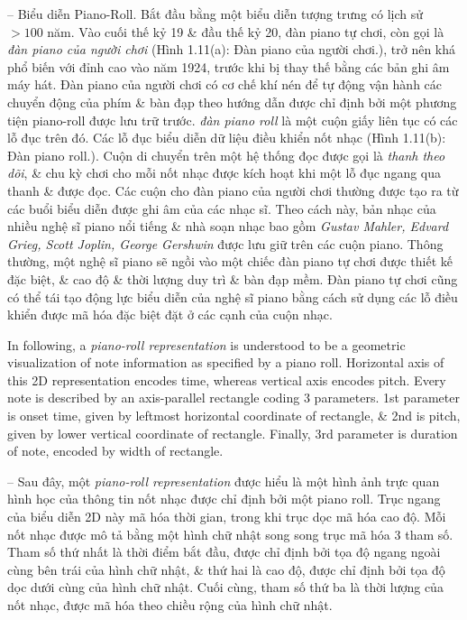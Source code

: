 \documentclass{article}
\begin{document}
\begin{itemize}
\begin{itemize}
\begin{itemize}
			-- {\sf Biểu diễn Piano-Roll.} Bắt đầu bằng một biểu diễn tượng trưng có lịch sử $> 100$ năm. Vào cuối thế kỷ 19 \& đầu thế kỷ 20, đàn piano tự chơi, còn gọi là {\it đàn piano của người chơi} ({\sf Hình 1.11(a): Đàn piano của người chơi.}), trở nên khá phổ biến với đỉnh cao vào năm 1924, trước khi bị thay thế bằng các bản ghi âm máy hát. Đàn piano của người chơi có cơ chế khí nén để tự động vận hành các chuyển động của phím \& bàn đạp theo hướng dẫn được chỉ định bởi một phương tiện piano-roll được lưu trữ trước. {\it đàn piano roll} là một cuộn giấy liên tục có các lỗ đục trên đó. Các lỗ đục biểu diễn dữ liệu điều khiển nốt nhạc ({\sf Hình 1.11(b): Đàn piano roll.}). Cuộn di chuyển trên một hệ thống đọc được gọi là {\it thanh theo dõi}, \& chu kỳ chơi cho mỗi nốt nhạc được kích hoạt khi một lỗ đục ngang qua thanh \& được đọc. Các cuộn cho đàn piano của người chơi thường được tạo ra từ các buổi biểu diễn được ghi âm của các nhạc sĩ. Theo cách này, bản nhạc của nhiều nghệ sĩ piano nổi tiếng \& nhà soạn nhạc bao gồm {\it Gustav Mahler, Edvard Grieg, Scott Joplin, George Gershwin} được lưu giữ trên các cuộn piano. Thông thường, một nghệ sĩ piano sẽ ngồi vào một chiếc đàn piano tự chơi được thiết kế đặc biệt, \& cao độ \& thời lượng duy trì \& bàn đạp mềm. Đàn piano tự chơi cũng có thể tái tạo động lực biểu diễn của nghệ sĩ piano bằng cách sử dụng các lỗ điều khiển được mã hóa đặc biệt đặt ở các cạnh của cuộn nhạc.
			
			In following, a {\it piano-roll representation} is understood to be a geometric visualization of note information as specified by a piano roll. Horizontal axis of this 2D representation encodes time, whereas vertical axis encodes pitch. Every note is described by an axis-parallel rectangle coding 3 parameters. 1st parameter is onset time, given by leftmost horizontal coordinate of rectangle, \& 2nd is pitch, given by lower vertical coordinate of rectangle. Finally, 3rd parameter is duration of note, encoded by width of rectangle.
			
			-- Sau đây, một {\it piano-roll representation} được hiểu là một hình ảnh trực quan hình học của thông tin nốt nhạc được chỉ định bởi một piano roll. Trục ngang của biểu diễn 2D này mã hóa thời gian, trong khi trục dọc mã hóa cao độ. Mỗi nốt nhạc được mô tả bằng một hình chữ nhật song song trục mã hóa 3 tham số. Tham số thứ nhất là thời điểm bắt đầu, được chỉ định bởi tọa độ ngang ngoài cùng bên trái của hình chữ nhật, \& thứ hai là cao độ, được chỉ định bởi tọa độ dọc dưới cùng của hình chữ nhật. Cuối cùng, tham số thứ ba là thời lượng của nốt nhạc, được mã hóa theo chiều rộng của hình chữ nhật.
			

\end{itemize}
\end{itemize}
\end{itemize}
\end{document}
